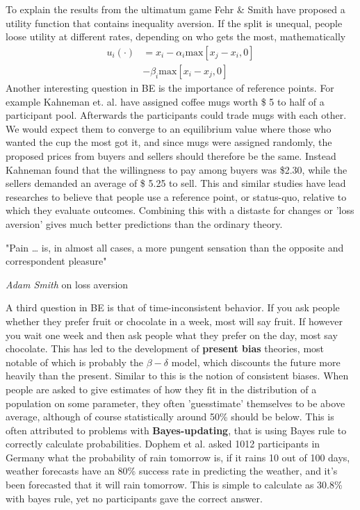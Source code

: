 \documentclass[12pt, a4paper]{article}
\begin{document}
\begin{multicols}{2}
\\ \\
To explain the results from the ultimatum game Fehr \& Smith have proposed a utility function that contains inequality aversion. If the split is unequal, people loose utility at different rates, depending on who gets the most, mathematically
\begin{align*}
u_i(\cdot) &= x_i - \alpha_i \text{max}[x_j - x_i, 0] \\
& -  \beta_i \text{max}[x_i - x_j, 0]
\end{align*}
Another interesting question in BE is the importance of reference points. For example Kahneman et. al. have assigned coffee mugs worth \$ 5 to half of a participant pool. Afterwards the participants could trade mugs with each other. We would expect them to converge to an equilibrium value where those who wanted the cup the most got it, and since mugs were assigned randomly, the proposed prices from buyers and sellers should therefore be the same. Instead Kahneman found that the willingness to pay among buyers was \$2.30, while the sellers demanded an average of \$ 5.25 to sell. This and similar studies have lead researches to believe that people use a reference point, or status-quo, relative to which they evaluate outcomes. Combining this with a distaste for changes or 'loss aversion' gives much better predictions than the ordinary theory. 
\epigraph{"Pain … is, in almost all cases, a more pungent sensation than the opposite and correspondent pleasure"}{\textit{Adam Smith} on loss aversion}
A third question in BE is that of time-inconsistent behavior. If you ask people whether they prefer fruit or chocolate in a week, most will say fruit. If however you wait one week and then ask people what they prefer on the day, most say chocolate. This has led to the development of \textbf{present bias} theories, most notable of which is probably the $\beta - \delta $ model, which discounts the future more heavily than the present. Similar to this is the notion of consistent biases. When people are asked to give estimates of how they fit in the distribution of a population on some parameter, they often 'guesstimate' themselves to be above average, although of course statistically around 50\% should be below. This is often attributed to problems with \textbf{Bayes-updating}, that is using Bayes rule to correctly calculate probabilities. Dophem et al. asked 1012 participants in Germany what the probability of rain tomorrow is, if it rains 10 out of 100 days, weather forecasts have an 80\% success rate in predicting the weather, and it's been forecasted that it will rain tomorrow. This is simple to calculate as 30.8\% with bayes rule, yet no participants gave the correct answer. 


\end{multicols}
\end{document}

